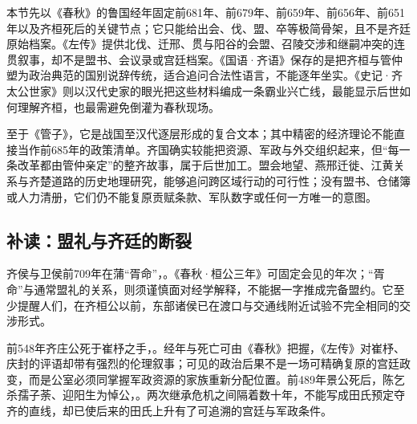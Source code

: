 \begin{sourcenote}[齐桓、管仲与传世叙事的层次]
本节先以《春秋》的鲁国经年固定前681年、前679年、前659年、前656年、前651年以及齐桓死后的关键节点；它只能给出会、伐、盟、卒等极简骨架，且不是齐廷原始档案。《左传》提供北伐、迁邢、贯与阳谷的会盟、召陵交涉和继嗣冲突的连贯叙事，却不是盟书、会议录或宫廷档案。《国语·齐语》保存的是把齐桓与管仲塑为政治典范的国别说辞传统，适合追问合法性语言，不能逐年坐实。《史记·齐太公世家》则以汉代史家的眼光把这些材料编成一条霸业兴亡线，最能显示后世如何理解齐桓，也最需避免倒灌为春秋现场。

至于《管子》，它是战国至汉代逐层形成的复合文本；其中精密的经济理论不能直接当作前685年的政策清单。齐国确实较能把资源、军政与外交组织起来，但“每一条改革都由管仲亲定”的整齐故事，属于后世加工。盟会地望、燕邢迁徙、江黄关系与齐楚道路的历史地理研究，能够追问跨区域行动的可行性；没有盟书、仓储簿或人力清册，它们仍不能复原贡赋条款、军队数字或任何一方唯一的意图。
\end{sourcenote}
\subsection{补读：盟礼与齐廷的断裂}

齐侯与卫侯前709年在蒲“胥命”，。《春秋·桓公三年》可固定会见的年次；“胥命”与通常盟礼的关系，则须谨慎面对经学解释，不能据一字推成完备盟约。它至少提醒人们，在齐桓公以前，东部诸侯已在渡口与交通线附近试验不完全相同的交涉形式。

前548年齐庄公死于崔杼之手，。经年与死亡可由《春秋》把握，《左传》对崔杼、庆封的评语却带有强烈的伦理叙事；可见的政治后果不是一场可精确复原的宫廷政变，而是公室必须同掌握军政资源的家族重新分配位置。前489年景公死后，陈乞杀孺子荼、迎阳生为悼公，。两次继承危机之间隔着数十年，不能写成田氏预定夺齐的直线，却已使后来的田氏上升有了可追溯的宫廷与军政条件。
